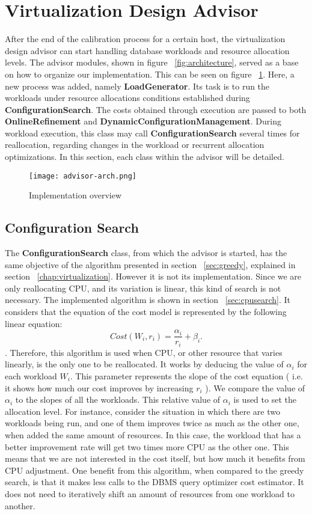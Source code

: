 \section{Virtualization Design Advisor}

After the end of the calibration process for a certain host, the virtualization design advisor can start handling database workloads and resource allocation levels. The advisor modules, shown in figure ~\ref{fig:architecture}, served as a base on how to organize our implementation. This can be seen on figure ~\ref{fig:advisor}. Here, a new process was added, namely \textbf{LoadGenerator}.  Its task is to run the workloads under resource allocations conditions established during \textbf{ConfigurationSearch}. The costs obtained through execution are passed to both \textbf{OnlineRefinement} and \textbf{DynamicConfigurationManagement}. During workload execution, this class may call \textbf{ConfigurationSearch} several times for reallocation, regarding changes in the workload or recurrent allocation optimizations. In this section, each class within the advisor will be detailed.


\begin{figure}[ht]
\centering
\texttt{[image: advisor-arch.png]}
\caption{Implementation overview}
\label{fig:advisor}
\end{figure} 

\subsection{Configuration Search}

The \textbf{ConfigurationSearch} class, from which the advisor is started,  has the same objective of the algorithm presented in section ~\ref{sec:greedy}, explained in section  ~\ref{chap:virtualization}. However it is not its implementation. Since we are only reallocating CPU, and its variation is linear, this kind of search is not necessary. The implemented algorithm is shown in section ~\ref{sec:cpusearch}. It considers that the equation of the cost model is represented by the following linear equation:
\[
 Cost(W_{i}, r_{i}) = \frac{\alpha_{i}}{r_{i}} +\beta_{i}.
\].
Therefore, this algorithm is used when CPU, or other resource that varies linearly, is the only one to be reallocated. It works by deducing the value of $\alpha_{i}$ for each workload $W_{i}$. This parameter represents the slope of the cost equation ( i.e. it shows how much our cost improves by increasing $r_{i}$ ). We compare the  value of $\alpha_{i}$ to the slopes of all the workloads. This relative value of $\alpha_{i}$ is used to set the allocation level. For instance, consider the situation in which there are two workloads being run, and one of them improves twice as much as the other one, when added the same amount of resources. In this case, the workload that has a better improvement rate will get two times more CPU as the other one. This means that we are not interested in the cost itself, but how much it benefits from CPU adjustment. One benefit from this algorithm, when compared to the greedy search, is that it makes less calls to the DBMS query optimizer cost estimator. It does not need to iteratively shift an amount of resources from one workload to another.


